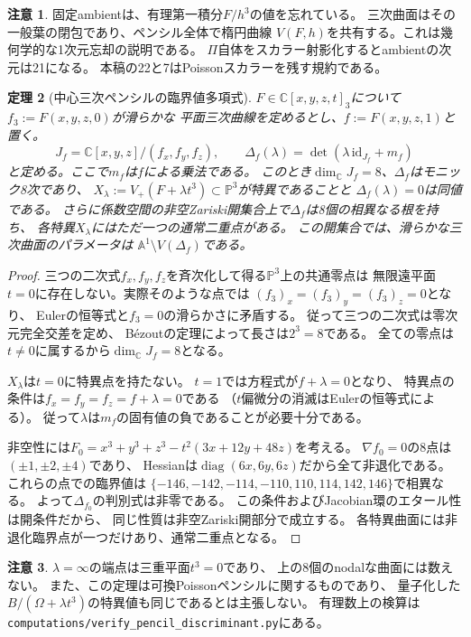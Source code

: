 \documentclass[11pt,a4paper]{ltjsarticle}
\newtheorem{theorem}{定理}[section]
\theoremstyle{definition}\newtheorem{remark}[theorem]{注意}
\newcommand{\PP}{\mathbb P}\newcommand{\kk}{\mathbb C}
\begin{document}
\begin{remark}
固定ambientは、有理第一積分$F/h^3$の値を忘れている。
三次曲面はその一般葉の閉包であり、ペンシル全体で楕円曲線
$V(F,h)$を共有する。これは幾何学的な1次元忘却の説明である。
$\Pi$自体をスカラー射影化するとambientの次元は21になる。
本稿の22と7はPoissonスカラーを残す規約である。
\end{remark}


\begin{theorem}[中心三次ペンシルの臨界値多項式]\label{thm:pencil-critical}
$F\in\kk[x,y,z,t]_3$について$f_3:=F(x,y,z,0)$が滑らかな
平面三次曲線を定めるとし、$f:=F(x,y,z,1)$と置く。
\[
 J_f=\kk[x,y,z]/(f_x,f_y,f_z),\qquad
 \Delta_f(\lambda)=\det(\lambda\,\mathrm{id}_{J_f}+m_f)
\]
と定める。ここで$m_f$は$f$による乗法である。
このとき$\dim_\kk J_f=8$、$\Delta_f$はモニック8次であり、
$X_\lambda:=V_+(F+\lambda t^3)\subset\PP^3$が特異であることと
$\Delta_f(\lambda)=0$は同値である。
さらに係数空間の非空Zariski開集合上で$\Delta_f$は8個の相異なる根を持ち、
各特異$X_\lambda$にはただ一つの通常二重点がある。
この開集合では、滑らかな三次曲面のパラメータは
$\mathbb A^1\setminus V(\Delta_f)$である。
\end{theorem}
\begin{proof}
三つの二次式$f_x,f_y,f_z$を斉次化して得る$\PP^3$上の共通零点は
無限遠平面$t=0$に存在しない。実際そのような点では
$(f_3)_x=(f_3)_y=(f_3)_z=0$となり、
Eulerの恒等式と$f_3=0$の滑らかさに矛盾する。
従って三つの二次式は零次元完全交差を定め、
B\'ezoutの定理によって長さは$2^3=8$である。
全ての零点は$t\ne0$に属するから$\dim_\kk J_f=8$となる。

$X_\lambda$は$t=0$に特異点を持たない。
$t=1$では方程式が$f+\lambda=0$となり、
特異点の条件は$f_x=f_y=f_z=f+\lambda=0$である
（$t$偏微分の消滅はEulerの恒等式による）。
従って$\lambda$は$m_f$の固有値の負であることが必要十分である。

非空性には$F_0=x^3+y^3+z^3-t^2(3x+12y+48z)$を考える。
$\nabla f_0=0$の8点は$(\pm1,\pm2,\pm4)$であり、
Hessianは$\operatorname{diag}(6x,6y,6z)$だから全て非退化である。
これらの点での臨界値は
$\{-146,-142,-114,-110,110,114,142,146\}$で相異なる。
よって$\Delta_{f_0}$の判別式は非零である。
この条件およびJacobian環のエタール性は開条件だから、
同じ性質は非空Zariski開部分で成立する。
各特異曲面には非退化臨界点が一つだけあり、通常二重点となる。
\end{proof}
\begin{remark}
$\lambda=\infty$の端点は三重平面$t^3=0$であり、
上の8個のnodalな曲面には数えない。
また、この定理は可換Poissonペンシルに関するものであり、
量子化した$B/(\Omega+\lambda t^3)$の特異値も同じであるとは主張しない。
有理数上の検算は\texttt{computations/verify\_pencil\_discriminant.py}にある。
\end{remark}
\end{document}
